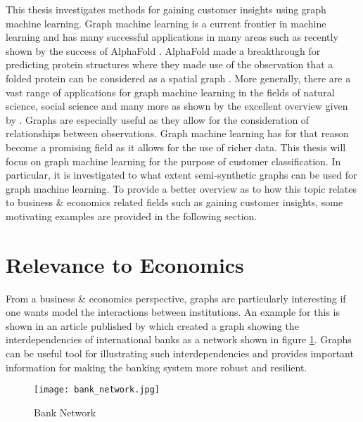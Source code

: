 	
	This thesis investigates methods for gaining customer insights using graph
	machine learning. Graph machine learning is a current frontier in machine 
	learning and has many successful applications in many areas such as recently 
	shown by the success of AlphaFold \citep{senior2020improved}. AlphaFold made 
	a breakthrough for predicting protein structures where they made use of the 
	observation that a folded protein can be considered as a spatial graph 
	\citep{AlphaFoldTeam2020}. More generally, there are a vast range of 
	applications for graph machine learning in the fields of natural science, 
	social science and many more as shown by the excellent overview given by 
	\cite{zhou2020graph}. Graphs are especially useful as they allow for the 
	consideration of relationships between observations. Graph machine learning 
	has for that reason become a promising field as it allows for the use of
	richer data. This thesis will focus on graph machine learning for the
	purpose of customer classification. In particular, it is investigated to
	what extent semi-synthetic graphs can be used for graph machine learning.
	To provide a better overview as to how this topic relates to business \& 
	economics related fields such as gaining customer insights, some motivating
	examples are provided in the following section. 
	
	\section{Relevance to Economics}

	\noindent From a business \& economics perspective, graphs are particularly
	interesting if one wants model the interactions between institutions. An 
	example for this is shown in an article published by 
	\cite{schweitzer2009economic} which created a graph showing the 
	interdependencies of international banks as a network shown in figure 
	\ref{fig:bank_network}. Graphs can be useful tool for illustrating such 
	interdependencies and provides important information for making the banking 
	system more robust and resilient. 

	\begin{figure}[h]
		\centering
		\texttt{[image: bank\_network.jpg]}
		\caption{Bank Network}
		\cite[p. 424]{schweitzer2009economic}
		\label{fig:bank_network}
	\end{figure} 


